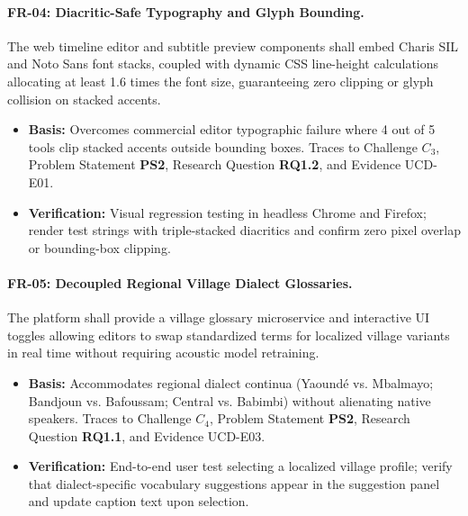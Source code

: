 \documentclass[conference]{IEEEtran}
\begin{document}
\paragraph{FR-04: Diacritic-Safe Typography and Glyph Bounding.}
The web timeline editor and subtitle preview components shall embed Charis SIL and Noto Sans font stacks, coupled with dynamic CSS line-height calculations allocating at least 1.6 times the font size, guaranteeing zero clipping or glyph collision on stacked accents.
\begin{itemize}
    \item \textbf{Basis:} Overcomes commercial editor typographic failure where 4 out of 5 tools clip stacked accents outside bounding boxes. Traces to Challenge $C_3$, Problem Statement \textbf{PS2}, Research Question \textbf{RQ1.2}, and Evidence UCD-E01.
    \item \textbf{Verification:} Visual regression testing in headless Chrome and Firefox; render test strings with triple-stacked diacritics and confirm zero pixel overlap or bounding-box clipping.
\end{itemize}

\paragraph{FR-05: Decoupled Regional Village Dialect Glossaries.}
The platform shall provide a village glossary microservice and interactive UI toggles allowing editors to swap standardized terms for localized village variants in real time without requiring acoustic model retraining.
\begin{itemize}
    \item \textbf{Basis:} Accommodates regional dialect continua (Yaound\'e vs. Mbalmayo; Bandjoun vs. Bafoussam; Central vs. Babimbi) without alienating native speakers. Traces to Challenge $C_4$, Problem Statement \textbf{PS2}, Research Question \textbf{RQ1.1}, and Evidence UCD-E03.
    \item \textbf{Verification:} End-to-end user test selecting a localized village profile; verify that dialect-specific vocabulary suggestions appear in the suggestion panel and update caption text upon selection.
\end{itemize}
\end{document}
